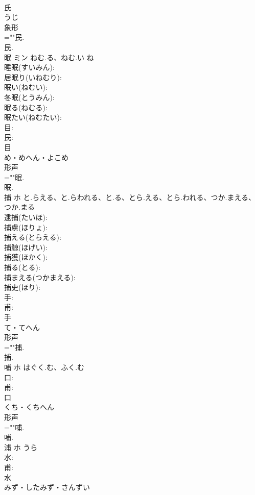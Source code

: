 \documentclass[8pt]{extreport}
\begin{document}
\begin{CJK}{UTF8}{min}
\\	氏	
\\	うじ	
\\	象形 
\\	=""民.
\\	民.
\\	眠	ミン	ねむ.る、ねむ.い	ね	
\\	睡眠(すいみん): 
\\	居眠り(いねむり): 
\\	眠い(ねむい): 
\\	冬眠(とうみん): 
\\	眠る(ねむる): 
\\	眠たい(ねむたい): 
\\	目: 
\\	民: 
\\	目	
\\	め・めへん・よこめ	
\\	形声 
\\	=""眠.
\\	眠.
\\	捕	ホ	と.らえる、と.らわれる、と.る、とら.える、とら.われる、つか.まえる、つか.まる		
\\	逮捕(たいほ): 
\\	捕虜(ほりょ): 
\\	捕える(とらえる): 
\\	捕鯨(ほげい): 
\\	捕獲(ほかく): 
\\	捕る(とる): 
\\	捕まえる(つかまえる): 
\\	捕吏(ほり): 
\\	手: 
\\	甫: 
\\	手	
\\	て・てへん	
\\	形声 
\\	=""捕.
\\	捕.
\\	哺	ホ	はぐく.む、ふく.む		
\\	口: 
\\	甫: 
\\	口	
\\	くち・くちへん	
\\	形声 
\\	=""哺.
\\	哺.
\\	浦	ホ	うら		
\\	水: 
\\	甫: 
\\	水	
\\	みず・したみず・さんずい	

\end{CJK}
\end{document}

